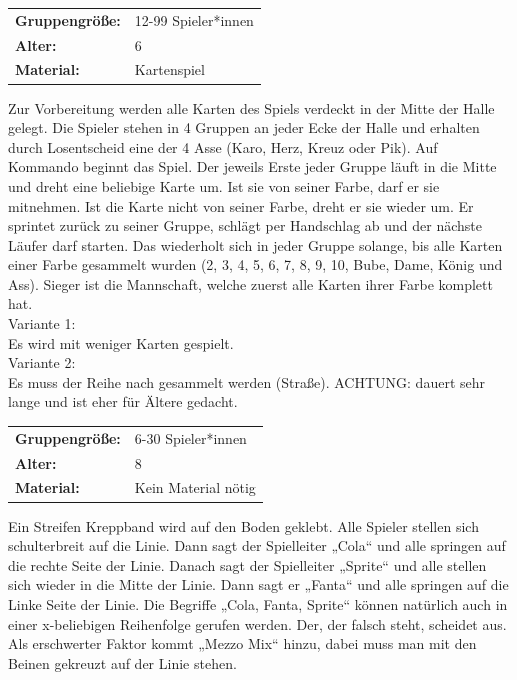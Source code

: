 \begin{table}[H]
\begin{tabular}{>{\bfseries}lp{8cm}}
   Gruppengröße:   & 12-99 Spieler*innen\\
    Alter: & 6 \\
    Material: & Kartenspiel \\
\end{tabular}
\end{table} 

Zur Vorbereitung werden alle Karten des Spiels verdeckt in der Mitte der Halle gelegt. Die Spieler stehen in 4 Gruppen an jeder Ecke der Halle und erhalten durch Losentscheid eine der 4 Asse (Karo, Herz, Kreuz oder Pik).
Auf Kommando beginnt das Spiel. Der jeweils Erste jeder Gruppe läuft in die Mitte und dreht eine beliebige Karte um. Ist sie von seiner Farbe, darf er sie mitnehmen. Ist die Karte nicht von seiner Farbe, dreht er sie wieder um. Er sprintet zurück zu seiner Gruppe, schlägt per Handschlag ab und der nächste Läufer darf starten. Das wiederholt sich in jeder Gruppe solange, bis alle Karten einer Farbe gesammelt wurden (2, 3, 4, 5, 6, 7, 8, 9, 10, Bube, Dame, König und Ass). Sieger ist die Mannschaft, welche zuerst alle Karten ihrer Farbe komplett hat.
 \\ \newline
 Variante 1: \\ Es wird mit weniger Karten gespielt.\\
 Variante 2: \\ Es muss der Reihe nach gesammelt werden (Straße). ACHTUNG: dauert sehr lange und ist eher für Ältere gedacht.\\
 




\begin{table}[H]
\begin{tabular}{>{\bfseries}lp{8cm}}
  Gruppengröße:   & 6-30 Spieler*innen\\
    Alter: & 8 \\
    Material: & Kein Material nötig \\ 
\end{tabular}
\end{table} 
 Ein Streifen Kreppband wird auf den Boden geklebt. Alle Spieler stellen sich schulterbreit auf die Linie. Dann sagt der Spielleiter „Cola“ und alle springen auf die rechte Seite der Linie. Danach sagt der Spielleiter „Sprite“ und alle stellen sich wieder in die Mitte der Linie. Dann sagt er „Fanta“ und alle springen auf die Linke Seite der Linie. Die Begriffe „Cola, Fanta, Sprite“ können natürlich auch in einer x-beliebigen Reihenfolge gerufen werden. Der, der falsch steht, scheidet aus. Als erschwerter Faktor kommt „Mezzo Mix“ hinzu, dabei muss man mit den Beinen gekreuzt auf der Linie stehen. \\




